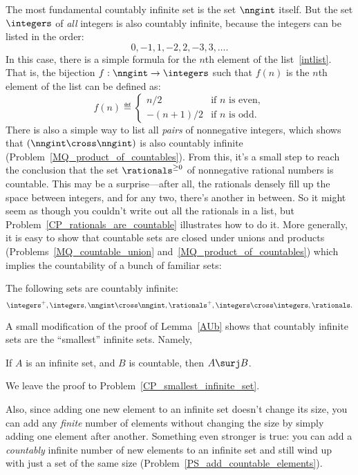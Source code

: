 The most fundamental countably infinite set is the set $\nngint$
itself.  But the set $\integers$ of \emph{all} integers is also
countably infinite, because the integers can be listed in the order:
\begin{equation}\label{intlist}
0,-1,1,-2,2,-3,3,\dots.
\end{equation}
In this case, there is a simple formula for the $n$th element of the
list~\eqref{intlist}.  That is, the bijection $f:\nngint \to
\integers$ such that $f(n)$ is the $n$th element of the list can be
defined as:
\[
f(n) \eqdef \begin{cases} n/2 & \text{if $n$ is even},\\ -(n+1)/2 &
  \text{if $n$ is odd}.
           \end{cases} 
\]    
There is also a simple way to list all \emph{pairs} of nonnegative
integers, which shows that $(\nngint \cross \nngint)$ is also
countably infinite (Problem~\ref{MQ_product_of_countables}).  From
this, it's a small step to reach the conclusion that the set
$\rationals^{\ge 0}$ of nonnegative rational numbers is countable.
This may be a surprise---after all, the rationals densely fill up the
space between integers, and for any two, there's another in between.
So it might seem as though you couldn't write out all the rationals in
a list, but Problem~\ref{CP_rationals_are_countable} illustrates how
to do it.  More generally, it is easy to show that countable sets are
closed under unions and products
(Problems~\ref{MQ_countable_union}
and~\ref{MQ_product_of_countables}) which implies the countability of
a bunch of familiar sets:
\begin{corollary}\label{countable_examples}
The following sets are countably infinite:
\[\integers^+, 
 \integers, \nngint \cross \nngint, \rationals^+, \integers \cross
 \integers, \rationals.
\]
\end{corollary}

A small modification of the proof of Lemma~\ref{AUb} shows that
countably infinite sets are the ``smallest'' infinite sets.  Namely,

\begin{lemma}\label{smallestinf}
If $A$ is an infinite set, and $B$ is countable, then $A \surj B$.
\end{lemma}
We leave the proof to Problem~\ref{CP_smallest_infinite_set}.

Also, since adding one new element to an infinite set doesn't change
its size, you can add any \emph{finite} number of elements without
changing the size by simply adding one element after another.
Something even stronger is true: you can add a \emph{countably}
infinite number of new elements to an infinite set and still wind up
with just a set of the same size
(Problem~\ref{PS_add_countable_elements}).

